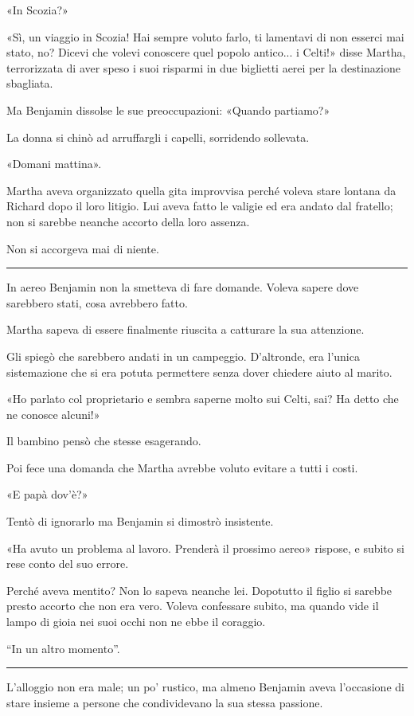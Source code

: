 \documentclass[a4paper,10pt]{memoir}
\begin{document}
«In Scozia?»

«Sì, un viaggio in Scozia! Hai sempre voluto farlo, ti lamentavi di non esserci mai stato, no? Dicevi che volevi
conoscere quel popolo antico... i Celti!» disse Martha, terrorizzata di aver speso i suoi risparmi in due biglietti
aerei per la destinazione sbagliata.

Ma Benjamin dissolse le sue preoccupazioni: «Quando partiamo?»

La donna si chinò ad arruffargli i capelli, sorridendo sollevata.

«Domani mattina».

Martha aveva organizzato quella gita improvvisa perché voleva stare lontana da Richard dopo il loro litigio. Lui aveva
fatto le valigie ed era andato dal fratello; non si sarebbe neanche accorto della loro assenza.

Non si accorgeva mai di niente.

\plainbreak{1}

In aereo Benjamin non la smetteva di fare domande. Voleva sapere dove sarebbero stati, cosa avrebbero fatto.

Martha sapeva di essere finalmente riuscita a catturare la sua attenzione.

Gli spiegò che sarebbero andati in un campeggio. D'altronde, era l'unica sistemazione che si era potuta permettere senza
dover chiedere aiuto al marito.

«Ho parlato col proprietario e sembra saperne molto sui Celti, sai? Ha detto che ne conosce alcuni!»

Il bambino pensò che stesse esagerando.

Poi fece una domanda che Martha avrebbe voluto evitare a tutti i costi.

«E papà dov'è?»

Tentò di ignorarlo ma Benjamin si dimostrò insistente.

«Ha avuto un problema al lavoro. Prenderà il prossimo aereo» rispose, e subito si rese conto del suo errore.

Perché aveva mentito? Non lo sapeva neanche lei. Dopotutto il figlio si sarebbe presto accorto che non era vero. Voleva
confessare subito, ma quando vide il lampo di gioia nei suoi occhi non ne ebbe il coraggio.

``In un altro momento''.

\plainbreak{1}

L’alloggio non era male; un po' rustico, ma almeno Benjamin aveva l'occasione di stare insieme a persone che
condividevano la sua stessa passione.
\end{document}
